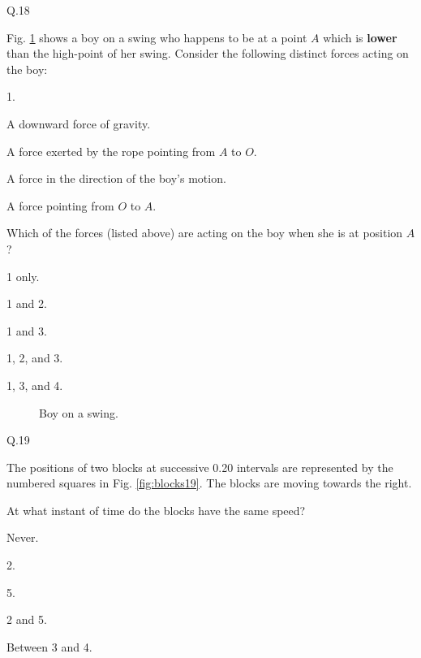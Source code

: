    \begin{mcq}{Q.18}{Fig. \ref{fig:swing} shows a boy on a swing who happens to be at a point $A$ which is \textbf{lower} than the high-point of her swing. Consider the following distinct forces acting on the boy:

        \eline[]
        \begin{options}{1.}
            \item A downward force of gravity.
            \item A force exerted by the rope pointing from $A$ to $O$.
            \item A force in the direction of the boy's motion.
            \item A force pointing from $O$ to $A$.
        \end{options}
        \eline[]

        Which of the forces (listed above) are acting on the boy when she is at position $A$?
    } 
        \item 1 only.
        \item 1 and 2.
        \item 1 and 3.
        \item 1, 2, and 3.
        \item 1, 3, and 4.
    \end{mcq}

    \eline[-5]
    \begin{minipage}{\textwidth}
        \begin{figure}[H]
            \begin{center}
                
                \caption{\label{fig:swing} Boy on a swing.}
            \end{center}
        \end{figure}
    \end{minipage}

    \begin{mcq}{Q.19}{The positions of two blocks at successive \SI{0.20}{\sec} intervals are represented by the numbered squares in Fig. \ref{fig:blocks19}. The blocks are moving towards the right.
       
        \eline[]
        At what instant of time do the blocks have the same speed?
        \eline[0.5]
    }
        \item Never.
        \item 2.
        \item 5.
        \item 2 and 5.
        \item Between 3 and 4.
    \end{mcq}
    \eline[]

